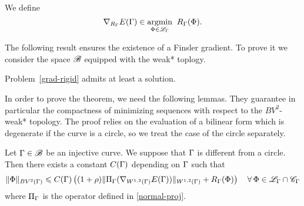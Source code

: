 \begin{defn} We define
\begin{equation}\label{grad-rigid}
	\nabla_{R_\Gamma} E(\Gamma) \in \underset{\Phi \in \mathcal{L}_\Gamma}{\operatorname{argmin}}\;\;  
   R_\Gamma(\Phi).
\end{equation}
\end{defn}

The following result  ensures the existence of a Finsler gradient. To prove  it we consider the space $\mathcal{B}$ equipped with the weak* toplogy.

\begin{thm}\label{existence1} 
	Problem~\eqref{grad-rigid}  admits at least a solution.
	
\end{thm}

In order to prove the theorem, we need the following lemmas. They guarantee in particular the compactness of minimizing sequences with respect to the $BV^2$-weak* topology. The proof relies on the evaluation of a bilinear form which is degenerate if the curve is a circle, so we treat the case of the circle separately. 

\begin{lem}\label{lem-compacity}
Let  $\Gamma\in \mathcal{B}$ be an injective curve.  We suppose that $\Gamma$ is different from a circle. Then there exists a constant $C(\Gamma)$ depending on $\Gamma$ such that 
\begin{equation}\label{compactnessR-1}
	 	\|  \Phi  \|_{BV^{2}(\Gamma)} \leqslant 
		C(\Gamma)\left( (1+\rho) \|\Pi_\Gamma(\nabla_{W^{1,2}(\Gamma)}E(\Gamma))\|_{W^{1,2}(\Gamma)} + R_\Gamma(\Phi) \right) \quad \forall\,\Phi \in \mathcal{L}_\Gamma \cap \mathcal{C}_\Gamma
\end{equation}
where $\Pi_\Gamma$ is the operator defined in \eqref{normal-proj}.	
\end{lem}


